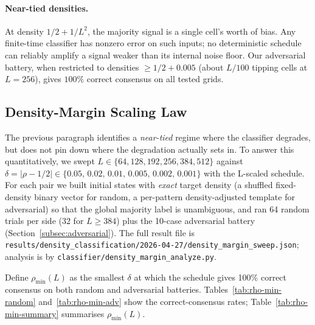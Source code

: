 \documentclass[11pt,a4paper]{article}
\newcommand{\fpath}[1]{\nolinkurl{#1}}
\begin{document}
\paragraph{Near-tied densities.}
At density \(1/2 + 1/L^2\), the majority signal is a single cell's worth of
bias.  Any finite-time classifier has nonzero error on such inputs; no
deterministic schedule can reliably amplify a signal weaker than its internal
noise floor.  Our adversarial battery, when restricted to densities
\(\geq 1/2 + 0.005\) (about \(L/100\) tipping cells at \(L=256\)), gives
\(100\%\) correct consensus on all tested grids.

\subsection{Density-Margin Scaling Law}
\label{subsec:rho-min}

The previous paragraph identifies a \emph{near-tied} regime where the
classifier degrades, but does not pin down where the degradation actually
sets in.  To answer this quantitatively, we swept
\(L\in\{64,128,192,256,384,512\}\) against
\(\delta = |\rho - 1/2| \in \{0.05,\,0.02,\,0.01,\,0.005,\,0.002,\,0.001\}\)
with the L-scaled schedule.  For each pair we built initial states with
\emph{exact} target density (a shuffled fixed-density binary vector for
random, a per-pattern density-adjusted template for adversarial) so that
the global majority label is unambiguous, and ran 64 random trials per
side (32 for \(L\geq 384\)) plus the 10-case adversarial battery
(Section~\ref{subsec:adversarial}).
The full result file is
\fpath{results/density_classification/2026-04-27/density_margin_sweep.json};
analysis is by \fpath{classifier/density_margin_analyze.py}.

Define \(\rho_{\min}(L)\) as the smallest \(\delta\) at which the schedule
gives 100\% correct consensus on both random and adversarial batteries.
Tables~\ref{tab:rho-min-random} and~\ref{tab:rho-min-adv} show the
correct-consensus rates; Table~\ref{tab:rho-min-summary} summarises
\(\rho_{\min}(L)\).
\end{document}
